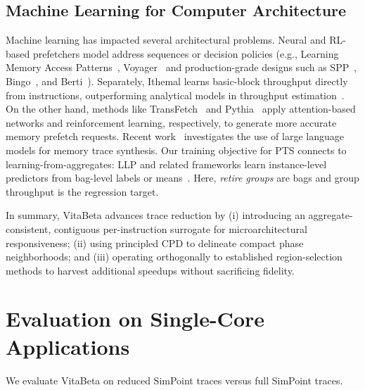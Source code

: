 \documentclass[conference]{IEEEtran}
\newcommand{\pts}{\textsc{PTS} }
\begin{document}
\subsection{Machine Learning for Computer Architecture}
Machine learning has impacted several architectural problems. Neural and RL-based prefetchers model address sequences or decision policies (e.g., Learning Memory Access Patterns~\cite{hashemi2018learning}, Voyager~\cite{voyager-asplos21} and production-grade designs such as SPP~\cite{spp-micro16}, Bingo~\cite{bingo-hpca19}, and Berti~\cite{berti-micro22}). Separately, Ithemal learns basic-block throughput directly from instructions, outperforming analytical models in throughput estimation~\cite{pmlr-v97-mendis19a}. 
On the other hand, methods like TransFetch~\cite{transfetch} and Pythia~\cite{pythia} apply attention-based networks and reinforcement learning, respectively, to generate more accurate memory prefetch requests. Recent work~\cite{mine} investigates the use of large language models for memory trace synthesis.
Our training objective for \pts connects to learning-from-aggregates: LLP and related frameworks learn instance-level predictors from bag-level labels or means~\cite{yu2014-llp,scott2020-llp,law2018-agg,zhang2020-agg}. Here, \emph{retire groups} are bags and group throughput is the regression target.
 


In summary, VitaBeta advances trace reduction by (i) introducing an aggregate-consistent, contiguous per-instruction surrogate for microarchitectural responsiveness; (ii) using principled CPD to delineate compact phase neighborhoods; and (iii) operating orthogonally to established region-selection methods to harvest additional speedups without sacrificing fidelity.

 

\section{Evaluation on Single-Core Applications} 
\label{evaluation_sc}
We evaluate VitaBeta on reduced SimPoint traces versus full SimPoint traces.
\end{document}
